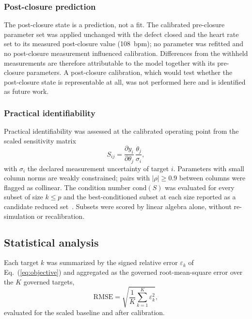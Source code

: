 \subsubsection{Post-closure prediction}
\label{sec:post_methods}
The post-closure state is a prediction, not a fit. The calibrated pre-closure parameter set was applied unchanged with the defect closed and the heart rate set to its measured post-closure value (108~bpm); no parameter was refitted and no post-closure measurement influenced calibration. Differences from the withheld measurements are therefore attributable to the model together with its pre-closure parameters. A post-closure calibration, which would test whether the post-closure state is representable at all, was not performed here and is identified as future work.

\subsubsection{Practical identifiability}
\label{sec:identifiability}
Practical identifiability was assessed at the calibrated operating point from the scaled sensitivity matrix~\cite{Pope2009,Olufsen2013}
\begin{equation}
S_{ij} = \frac{\partial y_i}{\partial \theta_j}\,\frac{\theta_j}{\sigma_i},
\label{eq:sensitivity}
\end{equation}
with $\sigma_i$ the declared measurement uncertainty of target $i$. Parameters with small column norms are weakly constrained; pairs with $\lvert\rho\rvert \ge 0.9$ between columns were flagged as collinear. The condition number $\mathrm{cond}(S)$ was evaluated for every subset of size $k \le p$ and the best-conditioned subset at each size reported as a candidate reduced set~\cite{vanOsta2020}. Subsets were scored by linear algebra alone, without re-simulation or recalibration.

\subsection{Statistical analysis}
\label{sec:statistics}
Each target $k$ was summarized by the signed relative error $\varepsilon_k$ of Eq.~(\ref{eq:objective}) and aggregated as the governed root-mean-square error over the $K$ governed targets,
\begin{equation}
\mathrm{RMSE} = \sqrt{\frac{1}{K}\sum_{k=1}^{K}\varepsilon_k^{2}},
\label{eq:rmse}
\end{equation}
evaluated for the scaled baseline and after calibration.

